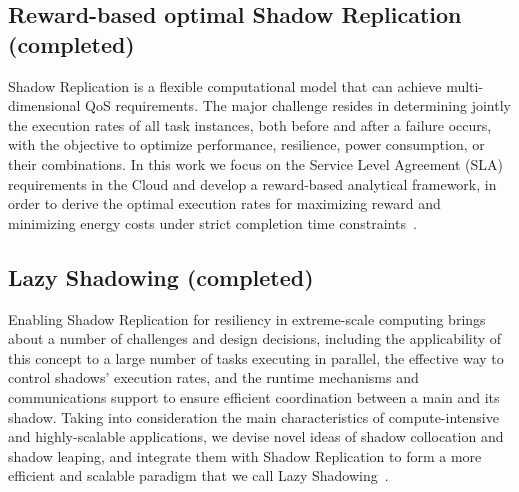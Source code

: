 
\subsection{Reward-based optimal Shadow Replication (completed)}
Shadow Replication is a flexible computational model that can achieve multi-dimensional QoS requirements. 
The major challenge resides in determining jointly the execution rates of all task instances, 
both before and after a failure occurs, with the objective to optimize performance, resilience, power consumption, or their combinations.
In this work we focus on the Service Level Agreement (SLA) requirements in the Cloud and develop a reward-based analytical framework, in order to derive the optimal execution rates for maximizing reward and minimizing energy 
costs under strict completion time constraints~\cite{cui_2014_closer,cui_en7085151}. 




\subsection{Lazy Shadowing (completed)}

Enabling Shadow Replication for resiliency in extreme-scale computing brings about a number of challenges and design decisions, including the applicability of this concept to a large number of tasks executing in parallel, 
the effective way to control shadows’ execution rates, and the runtime mechanisms and communications support to ensure efficient 
coordination between a main and its shadow. Taking into consideration the main characteristics of compute-intensive and 
highly-scalable applications, 
we devise novel ideas of shadow collocation and shadow leaping, and integrate them with Shadow Replication to form a more efficient and scalable paradigm that we call Lazy Shadowing~\cite{cui_2016_scalcom}.

